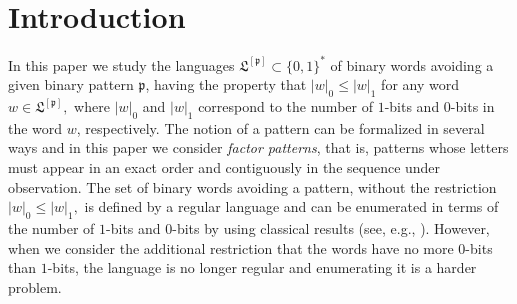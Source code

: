 

\section{Introduction}
\label{sec:avoiding-RA-patterns:introduction}


In this paper we study the languages  $\mathfrak{L}^{[\mathfrak{p}]}\subset
\{0,1\}^*$ of binary words avoiding a given binary pattern $\mathfrak{p}$,
having the property that $|w|_0\leq |w|_1$ for any word $w\in
\mathfrak{L}^{[\mathfrak{p}]},$ where  $|w|_0$ and $|w|_1$ correspond to the
number of $1$-bits  and $0$-bits in the word $w$, respectively.  The notion of a
pattern can be formalized in several ways and in this paper we consider
\textit{factor patterns}, that is, patterns whose  letters must appear in an
exact order and contiguously in the sequence under observation.  The set of
binary words avoiding a pattern, without the restriction $|w|_0\leq |w|_1,$ is
defined by a regular language and can be enumerated in terms of the number of
$1$-bits  and $0$-bits  by using classical results  (see, e.g.,
\citep{Guibas1980,GUIBAS1981183,Sedgewick:1996:IAA:227351}).
However, when we consider the additional restriction
that the words have no more $0$-bits  than $1$-bits, the language is no longer
regular and enumerating it is a harder problem.

